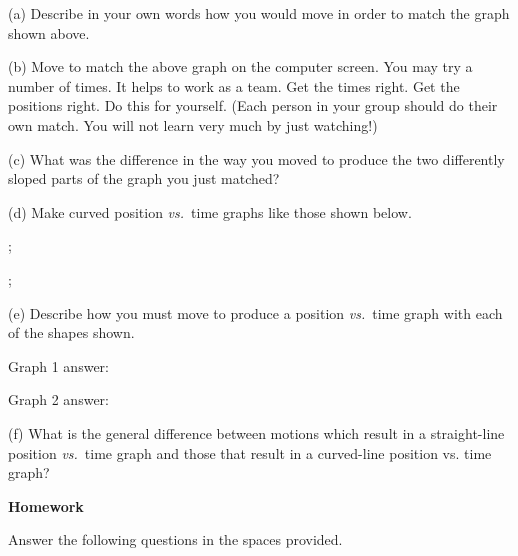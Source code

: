 (a) Describe in your own words how you would move in order to match the graph
shown above.
\answerspace{15mm}

(b) Move to match the above graph on the computer screen. You may try a number
of times. It helps to work as a team. Get the times right. Get the positions
right. Do this for yourself. (Each person in your group should do their own match. You will not learn very much by just watching!)

(c) What was the difference in the way you moved to produce the two differently
sloped parts of the graph you just matched?
\answerspace{12mm}

(d) Make curved position \textit{vs.}~time graphs like those shown below.

\begin{center}
\begin{lab_axis}[lab_noticks_1quad,
	height = {1.0in}, width = {1.5in},
	xlabel={Time},
	ylabel={Position},
	title={Graph 1},
	]
;
\end{lab_axis}
\hspace{0.5in}
\begin{lab_axis}[lab_noticks_1quad,
	height = {1.0in}, width = {1.5in},
	xlabel={Time},
	ylabel={Position},
	title={Graph 2},
	]
;
\end{lab_axis}
\end{center}


(e) Describe how you must move to produce a position \textit{vs.}~time graph with each
of the shapes shown.

Graph 1 answer:
\answerspace{10mm}

Graph 2 answer:
\answerspace{10mm}

\pagebreak[3]
(f) What is the general difference between motions which result in a straight-line
position \textit{vs.}~time graph and those that result in a curved-line position vs.
time graph?
\answerspace{15mm}

\textbf{Homework} 

Answer the following questions in the spaces provided.

